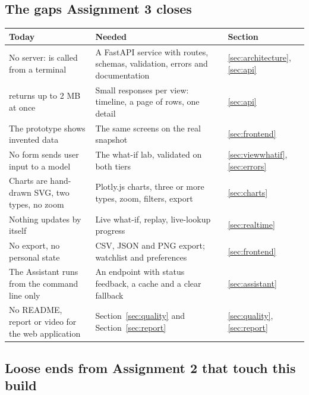 \subsection{The gaps Assignment 3 closes}
\label{sec:gaps}

\begin{center}
\small
\begin{tabularx}{\textwidth}{@{}L{5.2cm}Y L{2.0cm}@{}}
\toprule
\textbf{Today} & \textbf{Needed} & \textbf{Section} \\
\midrule
No server:  is called from a terminal & A FastAPI service with routes, schemas, validation, errors and documentation & \ref{sec:architecture}, \ref{sec:api} \\
 returns up to 2 MB at once & Small responses per view: timeline, a page of rows, one detail & \ref{sec:api} \\
The prototype shows invented data & The same screens on the real snapshot & \ref{sec:frontend} \\
No form sends user input to a model & The what-if lab, validated on both tiers & \ref{sec:viewwhatif}, \ref{sec:errors} \\
Charts are hand-drawn SVG, two types, no zoom & Plotly.js charts, three or more types, zoom, filters, export & \ref{sec:charts} \\
Nothing updates by itself & Live what-if, replay, live-lookup progress & \ref{sec:realtime} \\
No export, no personal state & CSV, JSON and PNG export; watchlist and preferences & \ref{sec:frontend} \\
The Assistant runs from the command line only & An endpoint with status feedback, a cache and a clear fallback & \ref{sec:assistant} \\
No README, report or video for the web application & Section~\ref{sec:quality} and Section~\ref{sec:report} & \ref{sec:quality}, \ref{sec:report} \\
\bottomrule
\end{tabularx}
\end{center}

\subsection{Loose ends from Assignment 2 that touch this build}
\label{sec:looseends}

